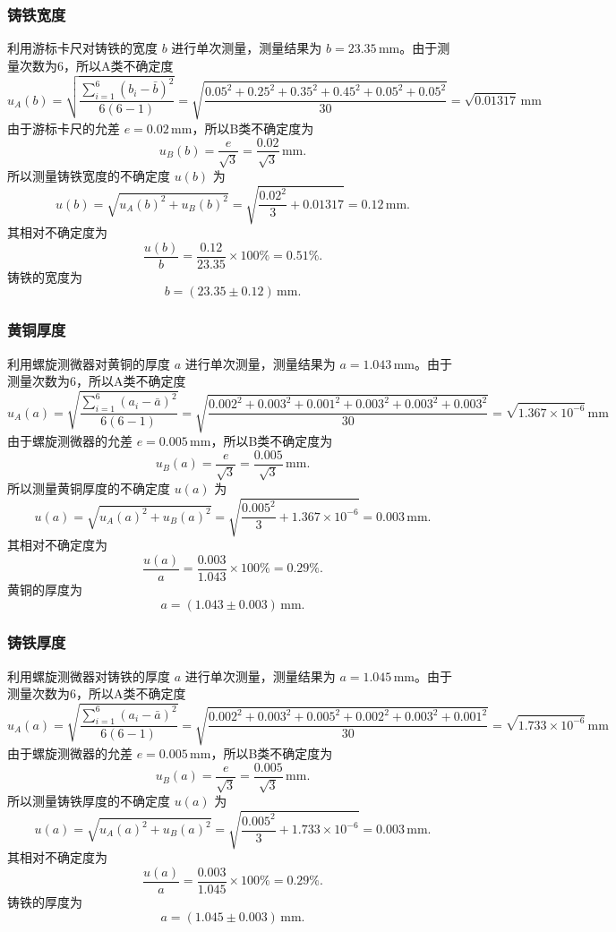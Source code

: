 \documentclass[zihao=5, UTF8]{article}
\theoremstyle{MyLineTheoremStyle} %
\theoremstyle{MyBlockTheoremStyle} %
\theoremstyle{MySubsubsectionStyle} %
\begin{document}
\subsubsection{铸铁宽度}
利用游标卡尺对铸铁的宽度 \( b \) 进行单次测量，测量结果为 \( b = 23.35 \, \text{mm} \)。由于测量次数为6，所以A类不确定度
\[ u_A (b) = \sqrt{\frac{\sum_{i=1}^{6}(b_i - \bar{b})^2}{6(6-1)}} = \sqrt{\frac{0.05^2 + 0.25^2 + 0.35^2 + 0.45^2 + 0.05^2 + 0.05^2}{30}} = \sqrt{0.01317} \, \text{mm} \]
由于游标卡尺的允差 \( e = 0.02 \, \text{mm} \)，所以B类不确定度为
\[ u_B (b) = \frac{e}{\sqrt{3}} = \frac{0.02}{\sqrt{3}} \, \text{mm}. \]
所以测量铸铁宽度的不确定度 \( u(b) \) 为
\[ u(b) = \sqrt{u_A (b)^2 + u_B (b)^2} = \sqrt{\frac{0.02^2}{3} + 0.01317} = 0.12 \, \text{mm}. \]
其相对不确定度为
\[ \frac{u(b)}{b} = \frac{0.12}{23.35} \times 100\% = 0.51\%. \]
铸铁的宽度为
\[ b = (23.35 \pm 0.12) \, \text{mm}. \]

\subsubsection{黄铜厚度}
利用螺旋测微器对黄铜的厚度 \( a \) 进行单次测量，测量结果为 \( a = 1.043 \, \text{mm} \)。由于测量次数为6，所以A类不确定度
\[ u_A (a) = \sqrt{\frac{\sum_{i=1}^{6}(a_i - \bar{a})^2}{6(6-1)}} = \sqrt{\frac{0.002^2 + 0.003^2 + 0.001^2 + 0.003^2 + 0.003^2 + 0.003^2}{30}} = \sqrt{1.367 \times 10^{-6}} \, \text{mm} \]
由于螺旋测微器的允差 \( e = 0.005 \, \text{mm} \)，所以B类不确定度为
\[ u_B (a) = \frac{e}{\sqrt{3}} = \frac{0.005}{\sqrt{3}} \, \text{mm}. \]
所以测量黄铜厚度的不确定度 \( u(a) \) 为
\[ u(a) = \sqrt{u_A (a)^2 + u_B (a)^2} = \sqrt{\frac{0.005^2}{3} + 1.367 \times 10^{-6}} = 0.003 \, \text{mm}. \]
其相对不确定度为
\[ \frac{u(a)}{a} = \frac{0.003}{1.043} \times 100\% = 0.29\%. \]
黄铜的厚度为
\[ a = (1.043 \pm 0.003) \, \text{mm}. \]

\subsubsection{铸铁厚度}
利用螺旋测微器对铸铁的厚度 \( a \) 进行单次测量，测量结果为 \( a = 1.045 \, \text{mm} \)。由于测量次数为6，所以A类不确定度
\[ u_A (a) = \sqrt{\frac{\sum_{i=1}^{6}(a_i - \bar{a})^2}{6(6-1)}} = \sqrt{\frac{0.002^2 + 0.003^2 + 0.005^2 + 0.002^2 + 0.003^2 + 0.001^2}{30}} = \sqrt{1.733 \times 10^{-6}} \, \text{mm} \]
由于螺旋测微器的允差 \( e = 0.005 \, \text{mm} \)，所以B类不确定度为
\[ u_B (a) = \frac{e}{\sqrt{3}} = \frac{0.005}{\sqrt{3}} \, \text{mm}. \]
所以测量铸铁厚度的不确定度 \( u(a) \) 为
\[ u(a) = \sqrt{u_A (a)^2 + u_B (a)^2} = \sqrt{\frac{0.005^2}{3} + 1.733 \times 10^{-6}} = 0.003 \, \text{mm}. \]
其相对不确定度为
\[ \frac{u(a)}{a} = \frac{0.003}{1.045} \times 100\% = 0.29\%. \]
铸铁的厚度为
\[ a = (1.045 \pm 0.003) \, \text{mm}. \]
\end{document}
